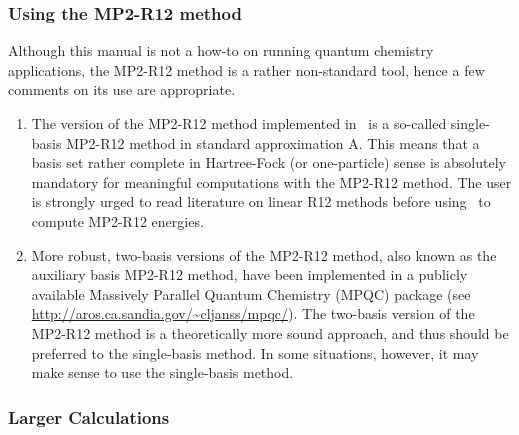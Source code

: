 \subsubsection{Using the MP2-R12 method}
Although this manual is not a how-to on running
quantum chemistry applications, the MP2-R12 method is
a rather non-standard tool, hence a few comments on its
use are appropriate.

\begin{enumerate}
\item
The version of the MP2-R12 method implemented in \PSIthree\
is a so-called single-basis MP2-R12 method
in standard approximation A. This means that a basis set
rather complete in Hartree-Fock (or one-particle) sense
is absolutely mandatory for meaningful computations with the MP2-R12
method. The user is strongly urged to read literature on
linear R12 methods before using \PSIthree\ to compute MP2-R12
energies.
\item
More robust, two-basis versions
of the MP2-R12 method, also known as the auxiliary basis
MP2-R12 method, have been implemented
in a publicly available Massively Parallel Quantum Chemistry (MPQC)
package (see \url{http://aros.ca.sandia.gov/~cljanss/mpqc/}).
The two-basis version of the MP2-R12 method is a theoretically more
sound approach, and thus should be preferred to the single-basis method.
In some situations, however, it may make sense to use
the single-basis method.
\end{enumerate}

\subsubsection{Larger Calculations}

